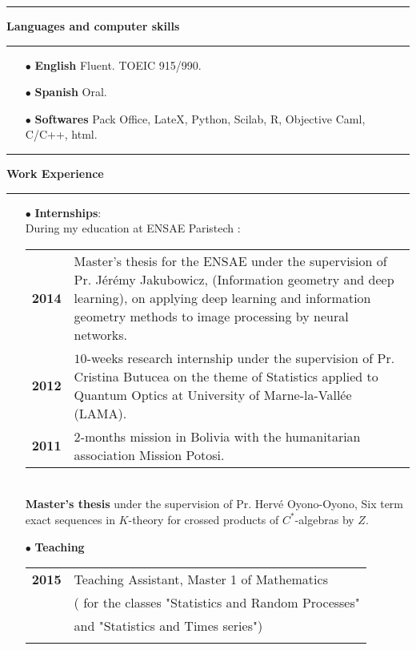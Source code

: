 \documentclass[a4paper,11pt]{article}
\newcommand\espace{\vrule height 20pt width 0pt}
\newcommand{\titre}[1]{%
	\begin{center}
	\bigskip
	\rule{\textwidth}{1pt}
	\par\vspace{0.1cm}
        \textbf{\large #1}
	\par\rule{\textwidth}{1pt}
	\end{center}
	\bigskip
	}
\begin{document}
\newpage
\titre{Languages and computer skills}


\begin{itemize} 
\medskip
\item[$\bullet$] \textbf{English} Fluent. TOEIC 915/990.
\medskip
\item[$\bullet$] \textbf{Spanish} Oral.
\medskip
\item[$\bullet$] \textbf{Softwares} Pack Office, LateX, Python, Scilab, R, Objective Caml, C/C++, html.

\end{itemize}

\titre{Work Experience}
\begin{itemize}
\medskip
\item[$\bullet$] \textbf{Internships}: \\

During my education at ENSAE Paristech : \\

\begin{tabular}{cp{}}
\textbf{2014} & Master's thesis for the ENSAE under the supervision of Pr. Jérémy Jakubowicz, (Information geometry and deep learning), on applying deep learning and information geometry methods to image processing by neural networks.\\
\textbf{2012}&  $10$-weeks research internship under the supervision of Pr. Cristina Butucea on the theme of Statistics applied to Quantum Optics at University of Marne-la-Vallée (LAMA).		\\
\textbf{2011} & $2$-months mission in Bolivia with the humanitarian association Mission Potosi.\\
\end{tabular}
\\

\textbf{Master's thesis} under the supervision of Pr. Hervé Oyono-Oyono, Six term exact sequences in $K$-theory for crossed products of $C^*$-algebras by $Z$.

\medskip

\item[$\bullet$] \textbf{Teaching} \\

\begin{tabular}{lp{}}

\textbf{2015} &  Teaching Assistant, Master 1 of Mathematics \\
			& ( for the classes "Statistics and Random Processes" \\
		& and "Statistics and Times series")\\
\espace


\end{tabular}
\end{itemize}
\end{document}
